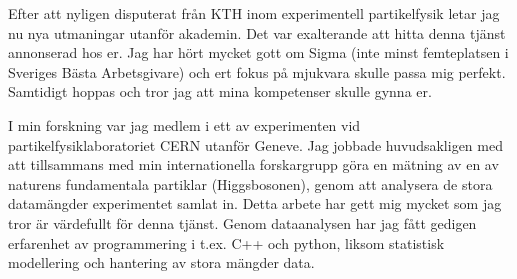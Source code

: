 \documentclass[11pt, a4paper]{../awesome-cv} %
\begin{document}
\sloppy %

\makecvheader %

\makelettertitle %


\begin{cvletter}
\vspace{.2cm}

Efter att nyligen disputerat från KTH inom experimentell partikelfysik letar jag nu nya utmaningar utanför akademin. %
Det var exalterande att hitta denna tjänst annonserad hos er.
Jag har hört mycket gott om Sigma (inte minst femteplatsen i Sveriges Bästa Arbetsgivare) och ert fokus på mjukvara skulle passa mig perfekt.
Samtidigt hoppas och tror jag att mina kompetenser skulle gynna er. 


I min forskning var jag medlem i ett av experimenten vid partikelfysiklaboratoriet CERN utanför Geneve.
Jag jobbade huvudsakligen med att tillsammans med min internationella forskargrupp göra en mätning av en av naturens fundamentala partiklar (Higgsbosonen), genom att analysera de stora datamängder experimentet samlat in. %
Detta arbete har gett mig mycket som jag tror är värdefullt för denna tjänst.
Genom dataanalysen har jag fått gedigen erfarenhet av programmering i t.ex. C++ och python, liksom statistisk modellering och hantering av stora mängder data.


\end{cvletter}
\end{document}
